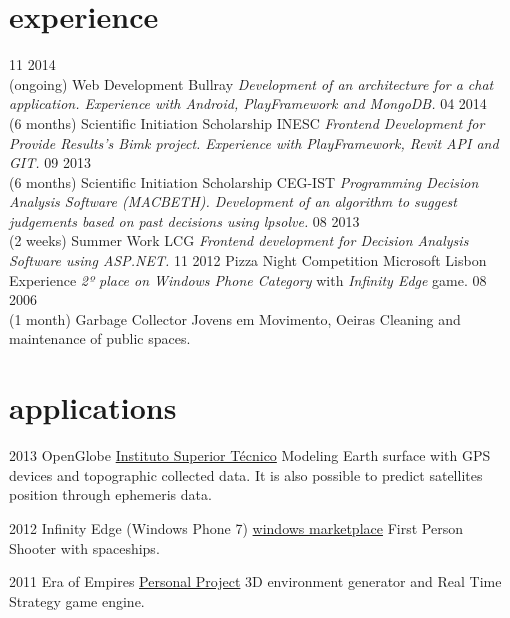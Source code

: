 \documentclass[]{friggeri-cv}
\begin{document}
\section{experience}


\begin{entrylist}
  \entry
    {11 2014\\(ongoing)}
    {Web Development}
    {Bullray}
    {\emph{Development of an architecture for a chat application. Experience with Android, PlayFramework and MongoDB.}}
  \entry
    {04 2014\\(6 months)}
    {Scientific Initiation Scholarship}
    {INESC}
    {\emph{Frontend Development for Provide Results's Bimk project. Experience with PlayFramework, Revit API and GIT.}}
  \entry
    {09 2013\\(6 months)}
    {Scientific Initiation Scholarship}
    {CEG-IST}
    {\emph{Programming Decision Analysis Software (MACBETH). Development of an algorithm to suggest judgements based on past decisions using \emph{lpsolve}.}}
  \entry
    {08 2013\\(2 weeks)}
    {Summer Work}
    {LCG}
    {\emph{Frontend development for Decision Analysis Software using \emph{ASP.NET}. }}
  \entry
    {11 2012}
    {Pizza Night Competition}
    {Microsoft Lisbon Experience}
    {\emph{2º place on Windows Phone Category} with \emph{Infinity Edge} game.}
  \entry
    {08 2006\\(1 month)}
    {Garbage Collector}
    {Jovens em Movimento, Oeiras}
    {Cleaning and maintenance of public spaces.}


\end{entrylist}

\section{applications}

\begin{entrylist}
  \entry
    {2013}
    {OpenGlobe}
    {\href{http://web.ist.utl.pt/ist168621/?page=10}{Instituto Superior Técnico}}
    {Modeling Earth surface with GPS devices and topographic collected data. It is also possible to predict satellites position through ephemeris data.}

  \entry
    {2012}
    {Infinity Edge (Windows Phone 7)}
    {\href{http://www.windowsphone.com/en-us/store/app/infinity-edge/05516463-3a89-4351-996e-62e5b4519aeb}{windows marketplace}}
    {First Person Shooter with spaceships.}

  \entry
    {2011}
    {Era of Empires}
    {\href{http://web.ist.utl.pt/ist168621/?page=8}{Personal Project}}
    {3D environment generator and Real Time Strategy game engine.}


\end{entrylist}
\end{document}
